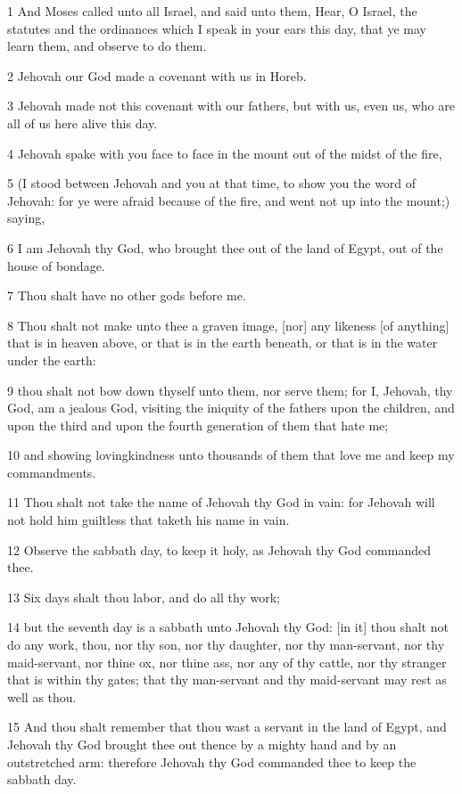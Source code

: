 \par 1 And Moses called unto all Israel, and said unto them, Hear, O Israel, the statutes and the ordinances which I speak in your ears this day, that ye may learn them, and observe to do them.
\par 2 Jehovah our God made a covenant with us in Horeb.
\par 3 Jehovah made not this covenant with our fathers, but with us, even us, who are all of us here alive this day.
\par 4 Jehovah spake with you face to face in the mount out of the midst of the fire,
\par 5 (I stood between Jehovah and you at that time, to show you the word of Jehovah: for ye were afraid because of the fire, and went not up into the mount;) saying,
\par 6 I am Jehovah thy God, who brought thee out of the land of Egypt, out of the house of bondage.
\par 7 Thou shalt have no other gods before me.
\par 8 Thou shalt not make unto thee a graven image, [nor] any likeness [of anything] that is in heaven above, or that is in the earth beneath, or that is in the water under the earth:
\par 9 thou shalt not bow down thyself unto them, nor serve them; for I, Jehovah, thy God, am a jealous God, visiting the iniquity of the fathers upon the children, and upon the third and upon the fourth generation of them that hate me;
\par 10 and showing lovingkindness unto thousands of them that love me and keep my commandments.
\par 11 Thou shalt not take the name of Jehovah thy God in vain: for Jehovah will not hold him guiltless that taketh his name in vain.
\par 12 Observe the sabbath day, to keep it holy, as Jehovah thy God commanded thee.
\par 13 Six days shalt thou labor, and do all thy work;
\par 14 but the seventh day is a sabbath unto Jehovah thy God: [in it] thou shalt not do any work, thou, nor thy son, nor thy daughter, nor thy man-servant, nor thy maid-servant, nor thine ox, nor thine ass, nor any of thy cattle, nor thy stranger that is within thy gates; that thy man-servant and thy maid-servant may rest as well as thou.
\par 15 And thou shalt remember that thou wast a servant in the land of Egypt, and Jehovah thy God brought thee out thence by a mighty hand and by an outstretched arm: therefore Jehovah thy God commanded thee to keep the sabbath day.

